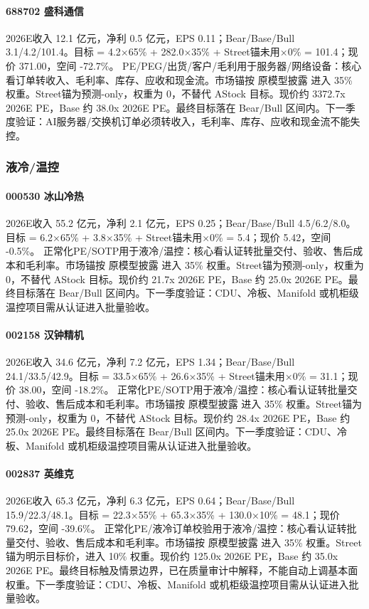 \paragraph{688702 盛科通信} 2026E收入 12.1 亿元，净利 0.5 亿元，EPS 0.11；Bear/Base/Bull 3.1/4.2/101.4。目标 = 4.2×65\% + 282.0×35\% + Street锚未用×0\% = 101.4；现价 371.00，空间 -72.7\%。 PE/PEG/出货/客户/毛利用于服务器/网络设备：核心看订单转收入、毛利率、库存、应收和现金流。市场锚按 原模型披露 进入 35\% 权重。Street锚为预测-only，权重为 0，不替代 AStock 目标。现价约 3372.7x 2026E PE，Base 约 38.0x 2026E PE。最终目标落在 Bear/Bull 区间内。下一季度验证：AI服务器/交换机订单必须转收入，毛利率、库存、应收和现金流不能失控。
\subsubsection*{液冷/温控}
\paragraph{000530 冰山冷热} 2026E收入 55.2 亿元，净利 2.1 亿元，EPS 0.25；Bear/Base/Bull 4.5/6.2/8.0。目标 = 6.2×65\% + 3.8×35\% + Street锚未用×0\% = 5.4；现价 5.42，空间 -0.5\%。 正常化PE/SOTP用于液冷/温控：核心看认证转批量交付、验收、售后成本和毛利率。市场锚按 原模型披露 进入 35\% 权重。Street锚为预测-only，权重为 0，不替代 AStock 目标。现价约 21.7x 2026E PE，Base 约 25.0x 2026E PE。最终目标落在 Bear/Bull 区间内。下一季度验证：CDU、冷板、Manifold 或机柜级温控项目需从认证进入批量验收。
\paragraph{002158 汉钟精机} 2026E收入 34.6 亿元，净利 7.2 亿元，EPS 1.34；Bear/Base/Bull 24.1/33.5/42.9。目标 = 33.5×65\% + 26.6×35\% + Street锚未用×0\% = 31.1；现价 38.00，空间 -18.2\%。 正常化PE/SOTP用于液冷/温控：核心看认证转批量交付、验收、售后成本和毛利率。市场锚按 原模型披露 进入 35\% 权重。Street锚为预测-only，权重为 0，不替代 AStock 目标。现价约 28.4x 2026E PE，Base 约 25.0x 2026E PE。最终目标落在 Bear/Bull 区间内。下一季度验证：CDU、冷板、Manifold 或机柜级温控项目需从认证进入批量验收。
\paragraph{002837 英维克} 2026E收入 65.3 亿元，净利 6.3 亿元，EPS 0.64；Bear/Base/Bull 15.9/22.3/48.1。目标 = 22.3×55\% + 65.3×35\% + 130.0×10\% = 48.1；现价 79.62，空间 -39.6\%。 正常化PE/液冷订单校验用于液冷/温控：核心看认证转批量交付、验收、售后成本和毛利率。市场锚按 原模型披露 进入 35\% 权重。Street锚为明示目标价，进入 10\% 权重。现价约 125.0x 2026E PE，Base 约 35.0x 2026E PE。最终目标触及情景边界，已在质量审计中解释，不能自动上调基本面权重。下一季度验证：CDU、冷板、Manifold 或机柜级温控项目需从认证进入批量验收。
